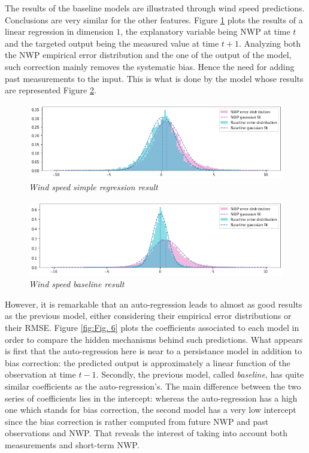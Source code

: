 \documentclass{article}
\begin{document}
The results of the baseline models are illustrated through wind speed predictions. Conclusions are very similar
for the other features. Figure \ref{fig:Fig. 4} plots the results of a linear regression in dimension $1$, the explanatory
variable being NWP at time $t$ and the targeted output being the measured value at time $t + 1$. Analyzing both
the NWP empirical error distribution and the one of the
output of the model, such correction mainly removes the systematic bias.
Hence the need for adding past measurements to the input. This is what is done by the model whose results
are represented Figure \ref{fig:Fig. 5}.


\begin{figure}[H]
    \centering
    \includegraphics[width=\linewidth]{img/base.png}
    \caption{\textit{Wind speed simple regression result}}
    \label{fig:Fig. 4}
\end{figure}

\begin{figure}[H]
    \centering
    \includegraphics[width=\linewidth]{img/baseline.png}
    \caption{\textit{Wind speed baseline result}}
    \label{fig:Fig. 5}
\end{figure}

However, it is remarkable that an auto-regression leads to almost as good results as the previous model, either
considering their empirical error distributions or their RMSE. Figure \ref{fig:Fig. 6} plots the coefficients associated to
each model in order to compare the hidden mechanisms behind such predictions. What appears is first that
the auto-regression here is near to a persistance model in addition to bias correction: the predicted output is
approximately a linear function of the observation at time $t - 1$. Secondly, the previous model, called \emph{baseline},
has quite similar coefficients as the auto-regression's. The main difference between the two series of coefficients
lies in the intercept: whereas the auto-regression has a high one which stands for bias correction, the second model
has a very low intercept since the bias correction is rather computed from future NWP and past observations and NWP.
That reveals the interest of taking into account both measurements and short-term NWP.
\end{document}
